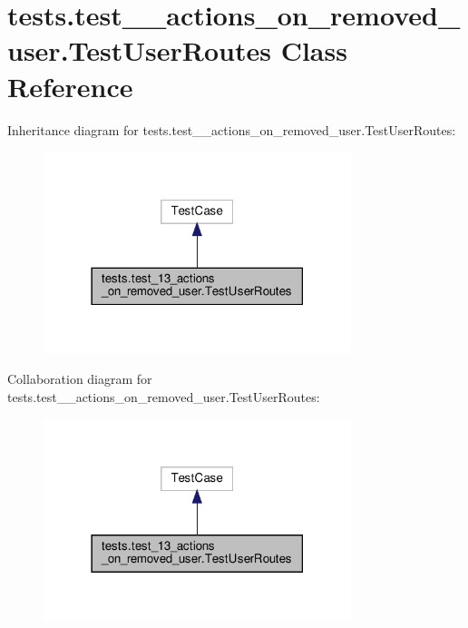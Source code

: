 \hypertarget{classtests_1_1test__13__actions__on__removed__user_1_1_test_user_routes}{}\section{tests.\+test\+\_\+\_\+actions\+\_\+on\+\_\+removed\+\_\+user.\+Test\+User\+Routes Class Reference}
\label{classtests_1_1test__13__actions__on__removed__user_1_1_test_user_routes}


Inheritance diagram for tests.\+test\+\_\+\_\+actions\+\_\+on\+\_\+removed\+\_\+user.\+Test\+User\+Routes\+:\nopagebreak
\begin{figure}[H]
\begin{center}
\leavevmode
\includegraphics[width=254pt]{classtests_1_1test__13__actions__on__removed__user_1_1_test_user_routes__inherit__graph}
\end{center}
\end{figure}


Collaboration diagram for tests.\+test\+\_\+\_\+actions\+\_\+on\+\_\+removed\+\_\+user.\+Test\+User\+Routes\+:\nopagebreak
\begin{figure}[H]
\begin{center}
\leavevmode
\includegraphics[width=254pt]{classtests_1_1test__13__actions__on__removed__user_1_1_test_user_routes__coll__graph}
\end{center}
\end{figure}
